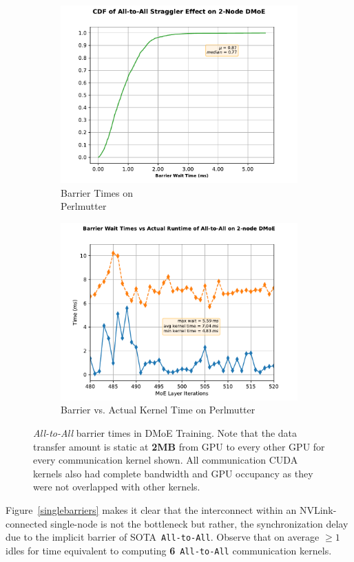 \begin{figure}[!h]
    \medskip %
    \begin{subfigure}{.5\linewidth}
        \centering
        \includegraphics[width=0.8\linewidth]{images/barrier_m}
        \caption{Barrier Times on \\ Perlmutter}
        \label{multibecdf}
    \end{subfigure}\hfill %
    \begin{subfigure}{.5\linewidth}
        \centering
        \includegraphics[width=0.8\linewidth, keepaspectratio]{images/m_distribution}
        \caption{Barrier vs. Actual Kernel Time on Perlmutter}
        \label{multibarriers}
    \end{subfigure}

    \caption{\small\emph{All-to-All} barrier times in DMoE Training.
    Note that the data transfer amount is static at \textbf{2MB} from GPU to
    every other GPU for every communication kernel shown. All communication CUDA kernels
    also had complete bandwidth and GPU occupancy as they were not overlapped with other kernels.}
    \label{fig:perfvar}
\end{figure}
Figure~\ref{singlebarriers} makes it clear that the interconnect within an NVLink-connected single-node
is not the bottleneck but rather, the synchronization delay due to the implicit barrier of SOTA~\verb|All-to-All|.
Observe that on average $\geq 1$ idles for time equivalent to computing \textbf{6}~\verb|All-to-All|
communication kernels.
